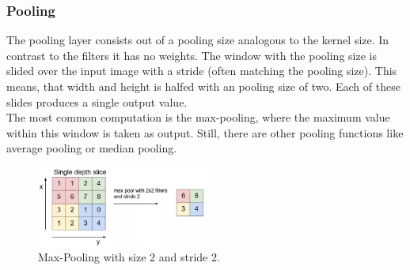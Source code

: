 \documentclass[
     11pt,         %
     a4paper,      %
     oneside,
     ]{article}
\begin{document}
\subsubsection{Pooling}
The pooling layer consists out of a pooling size analogous to the kernel size. In contrast to the filters it has no weights. The window with the pooling size is slided over the input image with a stride (often matching the pooling size). This means, that width and height is halfed with an pooling size of two. Each of these slides produces a single output value.\\
The most common computation is the max-pooling, where the maximum value within this window is taken as output. Still, there are other pooling functions like average pooling or median pooling.
\begin{figure}[H]
  \begin{center}
    \includegraphics[width=0.5\textwidth]{images/pooling.png}
    \caption{Max-Pooling with size 2 and stride 2.}
    \label{fig:pool}
  \end{center}
\end{figure}
\end{document}
